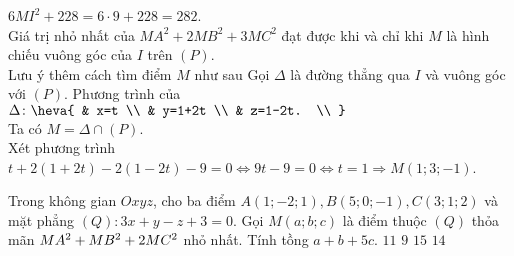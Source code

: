 \begin{ex}
{		$6M{{I}^2}+228=6\cdot9+228=282$.\\
		Giá trị nhỏ nhất của $M{{A}^2}+2M{{B}^2}+3M{{C}^2}$ đạt được khi và chỉ khi $M$ là hình chiếu vuông góc của $I$ trên $(P)$.\\
		Lưu ý thêm cách tìm điểm $M$ như sau
		Gọi $\Delta $ là đường thẳng qua $I$ và vuông góc với $(P)$. Phương trình của $\Delta\colon\heva{
			& x=t \\ 
			& y=1+2t \\ 
			& z=1-2t. \\ 
		} $\\
		Ta có $M=\Delta \cap (P)$.\\
		Xét phương trình
		$t+2\left(1+2t \right)-2\left(1-2t \right)-9=0\Leftrightarrow 9t-9=0\Leftrightarrow t=1\Rightarrow M\left(1;3;-1 \right)$.	
	}	
\end{ex}

\begin{ex}%
	Trong không gian $O x y z$, cho ba điểm $A(1;-2; 1), B(5; 0;-1), C(3; 1; 2)$ và mặt phẳng $(Q)\colon 3 x+y-z+3=0$. Gọi $M(a; b; c)$ là điểm thuộc $(Q)$ thỏa mãn $\linebreak M A^2+M B^2+2 M C^2$ nhỏ nhất. Tính tồng $a+b+5 c$.
	\choice
	{$11$}
	{\True$9$}
	{$15$}
	{$14$}
\end{ex}

